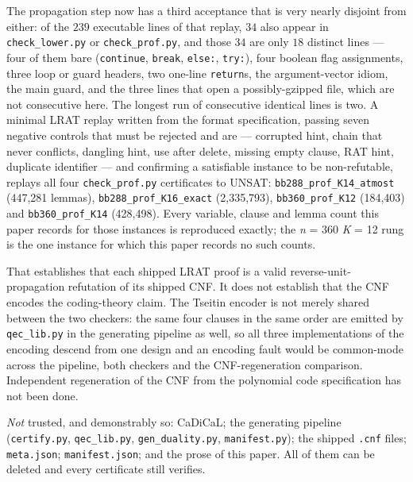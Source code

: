 \documentclass[11pt]{amsart}
\theoremstyle{plain}
\theoremstyle{definition}
\theoremstyle{remark}
\begin{document}
The propagation step now has a third acceptance that is very nearly disjoint
from either: of the $239$ executable lines of that replay, $34$ also appear in
\texttt{check\_lower.py} or \texttt{check\_prof.py}, and those $34$ are only
$18$ distinct lines --- four of them bare (\texttt{continue}, \texttt{break},
\texttt{else:}, \texttt{try:}), four boolean flag assignments, three loop or
guard headers, two one-line \texttt{return}s, the argument-vector idiom, the
main guard, and the three lines that open a possibly-gzipped file, which are
not consecutive here. The longest run of consecutive identical lines is two.
A minimal LRAT replay written from the format specification, passing
seven negative controls that must be rejected and are --- corrupted hint,
chain that never conflicts, dangling hint, use after delete, missing empty
clause, RAT hint, duplicate identifier --- and confirming a satisfiable
instance to be non-refutable, replays all four \texttt{check\_prof.py}
certificates to UNSAT: \texttt{bb288\_prof\_K14\_atmost} (447,281 lemmas),
\texttt{bb288\_prof\_K16\_exact} (2,335,793), \texttt{bb360\_prof\_K12}
(184,403) and \texttt{bb360\_prof\_K14} (428,498). Every variable, clause
and lemma count this paper records for those instances is reproduced
exactly; the \emph{n} = 360 \emph{K} = 12 rung is the one instance for which
this paper records no such counts.

That establishes that each shipped LRAT proof is a valid
reverse-unit-propagation refutation of its shipped CNF. It does not
establish that the CNF encodes the coding-theory claim. The Tseitin encoder
is not merely shared between the two checkers: the same four clauses in the
same order are emitted by \texttt{qec\_lib.py} in the generating pipeline as
well, so all three implementations of the encoding descend from one design
and an encoding fault would be common-mode across the pipeline, both
checkers and the CNF-regeneration comparison. Independent regeneration of
the CNF from the polynomial code specification has not been done.

\emph{Not} trusted, and demonstrably so: CaDiCaL; the generating pipeline
(\texttt{certify.py}, \texttt{qec\_lib.py}, \texttt{gen\_duality.py},
\texttt{manifest.py}); the shipped \texttt{.cnf} files; \texttt{meta.json};
\texttt{manifest.json}; and the prose of this paper. All of them can be
deleted and every certificate still verifies.
\end{document}
